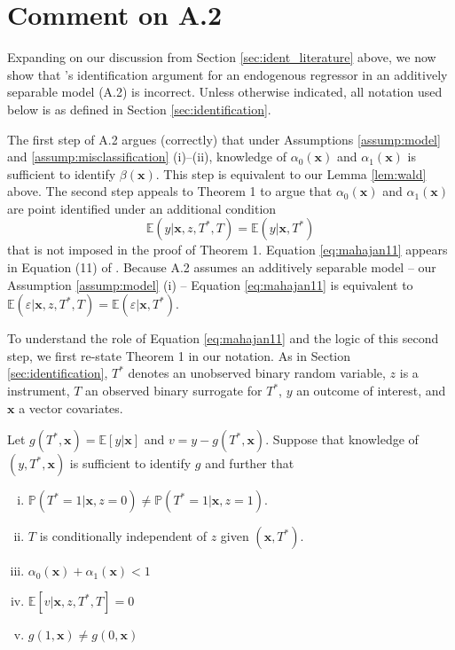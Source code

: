 \section{Comment on \cite{Mahajan} A.2}
\label{sec:mahajan}
Expanding on our discussion from Section \ref{sec:ident_literature} above, we now show that \citeauthor{Mahajan}'s identification argument for an endogenous regressor in an additively separable model (A.2) is incorrect.
Unless otherwise indicated, all notation used below is as defined in Section \ref{sec:identification}.

The first step of \cite{Mahajan} A.2 argues (correctly) that under Assumptions \ref{assump:model} and \ref{assump:misclassification} (i)--(ii), knowledge of $\alpha_0(\mathbf{x})$ and $\alpha_1(\mathbf{x})$ is sufficient to identify $\beta(\mathbf{x})$. 
This step is equivalent to our Lemma \ref{lem:wald} above.
The second step appeals to \cite{Mahajan} Theorem 1 to argue that $\alpha_0(\mathbf{x})$ and $\alpha_1(\mathbf{x})$ are point identified under an additional condition 
\begin{equation}
  \mathbb{E}(y|\mathbf{x},z,T^*,T) = \mathbb{E}(y|\mathbf{x},T^*)
  \label{eq:mahajan11}
\end{equation}
that is not imposed in the proof of Theorem 1.
Equation \ref{eq:mahajan11} appears in Equation (11) of \cite{Mahajan}.
Because \cite{Mahajan} A.2 assumes an additively separable model -- our Assumption \ref{assump:model} (i) -- Equation \ref{eq:mahajan11} is equivalent to $\mathbb{E}(\varepsilon|\mathbf{x},z,T^*,T)=\mathbb{E}(\varepsilon|\mathbf{x},T^*)$.

To understand the role of Equation \ref{eq:mahajan11} and the logic of this second step, we first re-state \cite{Mahajan} Theorem 1 in our notation.
As in Section \ref{sec:identification}, $T^*$ denotes an unobserved binary random variable, $z$ is a instrument, $T$ an observed binary surrogate for $T^*$, $y$ an outcome of interest, and $\mathbf{x}$ a vector covariates.

\begin{assump}
  Let $g(T^*, \mathbf{x}) = \mathbb{E}[y|\mathbf{x}]$ and $v = y - g(T^*,\mathbf{x})$.
  Suppose that knowledge of $(y,T^*,\mathbf{x})$ is sufficient to identify $g$ and further that
  \begin{enumerate}[(i)]
    \item $\mathbb{P}(T^*=1|\mathbf{x},z=0) \neq \mathbb{P}(T^*=1|\mathbf{x},z=1)$.
    \item $T$ is conditionally independent of $z$ given $(\mathbf{x}, T^*)$.
    \item $\alpha_0(\mathbf{x}) + \alpha_1(\mathbf{x}) < 1$
    \item $\mathbb{E}[v|\mathbf{x},z,T^*,T] = 0$
    \item $g(1,\mathbf{x}) \neq g(0, \mathbf{x})$
  \end{enumerate}
  \label{assump:mahajan1}
\end{assump}

